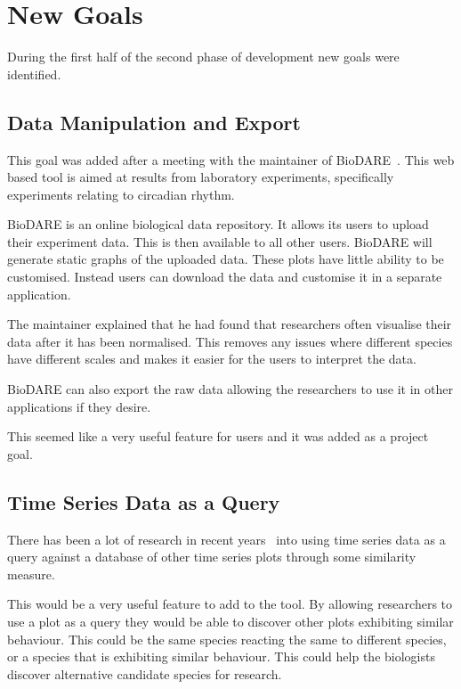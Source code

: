 \section{New Goals}
During the first half of the second phase of development new goals were identified.

\subsection{Data Manipulation and Export}

This goal was added after a meeting with the maintainer of BioDARE~\cite{biodare}.  This web based tool is aimed at results from laboratory experiments, specifically experiments relating to circadian rhythm.

BioDARE is an online biological data repository.  It allows its users to upload their experiment data.  This is then available to all other users.  BioDARE will generate static graphs of the uploaded data.  These plots have little ability to be customised.  Instead users can download the data and customise it in a separate application.

The maintainer explained that he had found that researchers often visualise their data after it has been normalised.  This removes any issues where different species have different scales and makes it easier for the users to interpret the data.

BioDARE can also export the raw data allowing the researchers to use it in other applications if they desire.

This seemed like a very useful feature for users and it was added as a project goal.

\subsection{Time Series Data as a Query}

There has been a lot of research in recent years~\cite{goldin, chakrabarti, popivanov, faloutsos2, bollobas} into using time series data as a query against a database of other time series plots through some similarity measure.

This would be a very useful feature to add to the tool.  By allowing researchers to use a plot as a query they would be able to discover other plots exhibiting similar behaviour.  This could be the same species reacting the same to different species, or a species that is exhibiting similar behaviour.  This could help the biologists discover alternative candidate species for research.

